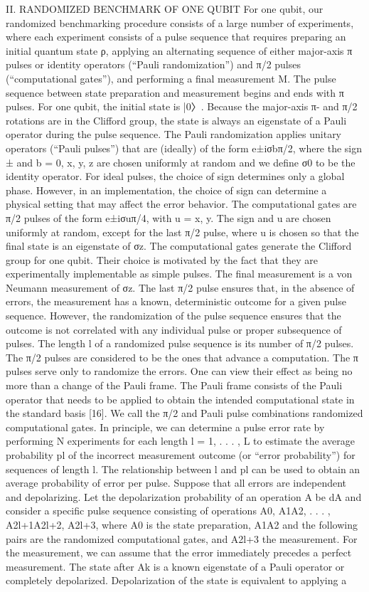 II. RANDOMIZED BENCHMARK OF ONE QUBIT For one qubit, our randomized benchmarking procedure consists of a large number of experiments, where each experiment consists of a pulse sequence that requires preparing an initial quantum state ρ, applying an alternating sequence of either major-axis π pulses or identity operators (“Pauli randomization”) and π/2 pulses (“computational gates”), and performing a final measurement M. The pulse sequence between state preparation and measurement begins and ends with π pulses. For one qubit, the initial state is |0〉. Because the major-axis π- and π/2 rotations are in the Clifford group, the state is always an eigenstate of a Pauli operator during the pulse sequence. The Pauli randomization applies unitary operators (“Pauli pulses”) that are (ideally) of the form e±iσbπ/2, where the sign ± and b = 0, x, y, z are chosen uniformly at random and we define σ0 to be the identity operator. For ideal pulses, the choice of sign determines only a global phase. However, in an implementation, the choice of sign can determine a physical setting that may affect the error behavior. The computational gates are π/2 pulses of the form e±iσuπ/4, with u = x, y. The sign and u are chosen uniformly at random, except for the last π/2 pulse, where u is chosen so that the final state is an eigenstate of σz. The computational gates generate the Clifford group for one qubit. Their choice is motivated by the fact that they are experimentally implementable as simple pulses. The final measurement is a von Neumann measurement of σz. The last π/2 pulse ensures that, in the absence of errors, the measurement has a known, deterministic outcome for a given pulse sequence. However, the randomization of the pulse sequence ensures that the outcome is not correlated with any individual pulse or proper subsequence of pulses. The length l of a randomized pulse sequence is its number of π/2 pulses. The π/2 pulses are considered to be the ones that advance a computation. The π pulses serve only to randomize the errors. One can view their effect as being no more than a change of the Pauli frame. The Pauli frame consists of the Pauli operator that needs to be applied to obtain the intended computational state in the standard basis [16]. We call the π/2 and Pauli pulse combinations randomized computational gates. In principle, we can determine a pulse error rate by performing N experiments for each length l = 1, . . . , L to estimate the average probability pl of the incorrect measurement outcome (or “error probability”) for sequences of length l. The relationship between l and pl can be used to obtain an average probability of error per pulse. Suppose that all errors are independent and depolarizing. Let the depolarization probability of an operation A be dA and consider a specific pulse sequence consisting of operations A0, A1A2, . . . , A2l+1A2l+2, A2l+3, where A0 is the state preparation, A1A2 and the following pairs are the randomized computational gates, and A2l+3 the measurement. For the measurement, we can assume that the error immediately precedes a perfect measurement. The state after Ak is a known eigenstate of a Pauli operator or completely depolarized. Depolarization of the state is equivalent to applying a 